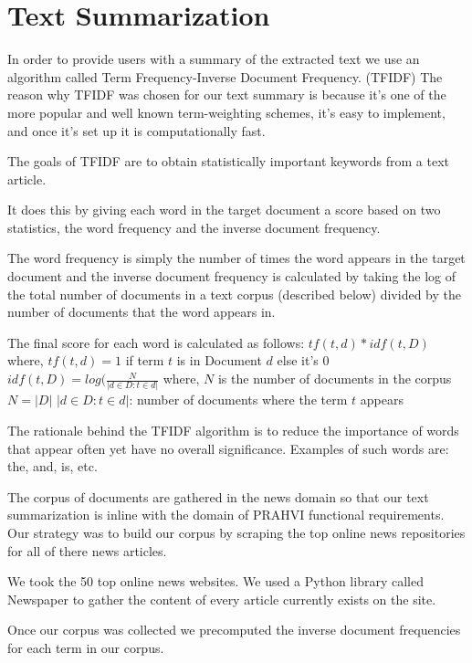 \section{Text Summarization}
In order to provide users with a summary of the extracted text we use an algorithm called Term Frequency-Inverse Document Frequency. (TFIDF) The reason why TFIDF was chosen for our text summary is because it's one of the more popular and well known term-weighting schemes, it's easy to implement, and once it's set up it is computationally fast.

The goals of TFIDF are to obtain statistically important keywords from a text article. 

It does this by giving each word in the target document a score based on two statistics, the word frequency and the inverse document frequency.

The word frequency is simply the number of times the word appears in the target document and the inverse document frequency is calculated by taking the log of the total number of documents in a text corpus (described below) divided by the number of documents that the word appears in.

The final score for each word is calculated as follows: 
$tf(t, d) * idf(t, D)$  
where,
$tf(t, d) = 1$ if term $t$	is in Document $d$ else it's $0$
$idf(t, D) = log(\frac{N}{|d \in D : t \in d|}$
where,
$N$ is the number of documents in the corpus $N = |D|$
${|d \in D : t \in d|}$: number of documents where the term $t$ appears 

The rationale behind the TFIDF algorithm is to reduce the importance of words that appear often yet have no overall significance. Examples of such words are: the, and, is, etc.


The corpus of documents are gathered in the news domain so that our text summarization is inline with the domain of PRAHVI functional requirements. Our strategy was to build our corpus by scraping the top online news repositories for all of there news articles. 

We took the 50 top online news websites. We used a Python library called Newspaper to gather the content of every article currently exists on the site.

Once our corpus was collected we precomputed the inverse document frequencies for each term in our corpus.
